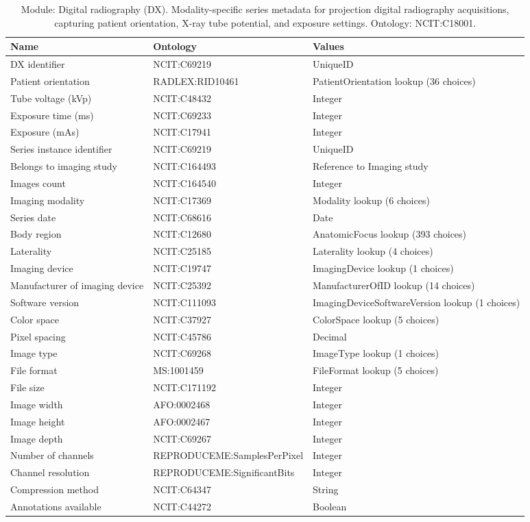 \documentclass{article}
\begin{document}
\begin{table}[htb]
\begin{tabular}{lll}
Name & Ontology & Values \\
\hline
DX identifier & NCIT:C69219 & UniqueID \\
Patient orientation & RADLEX:RID10461 & PatientOrientation lookup (36 choices) \\
Tube voltage (kVp) & NCIT:C48432 & Integer \\
Exposure time (ms) & NCIT:C69233 & Integer \\
Exposure (mAs) & NCIT:C17941 & Integer \\
Series instance identifier & NCIT:C69219 & UniqueID \\
Belongs to imaging study & NCIT:C164493 & Reference to Imaging study \\
Images count & NCIT:C164540 & Integer \\
Imaging modality & NCIT:C17369 & Modality lookup (6 choices) \\
Series date & NCIT:C68616 & Date \\
Body region & NCIT:C12680 & AnatomicFocus lookup (393 choices) \\
Laterality & NCIT:C25185 & Laterality lookup (4 choices) \\
Imaging device & NCIT:C19747 & ImagingDevice lookup (1 choices) \\
Manufacturer of imaging device & NCIT:C25392 & ManufacturerOfID lookup (14 choices) \\
Software version & NCIT:C111093 & ImagingDeviceSoftwareVersion lookup (1 choices) \\
Color space & NCIT:C37927 & ColorSpace lookup (5 choices) \\
Pixel spacing & NCIT:C45786 & Decimal \\
Image type & NCIT:C69268 & ImageType lookup (1 choices) \\
File format & MS:1001459 & FileFormat lookup (5 choices) \\
File size & NCIT:C171192 & Integer \\
Image width & AFO:0002468 & Integer \\
Image height & AFO:0002467 & Integer \\
Image depth & NCIT:C69267 & Integer \\
Number of channels & REPRODUCEME:SamplesPerPixel & Integer \\
Channel resolution & REPRODUCEME:SignificantBits & Integer \\
Compression method & NCIT:C64347 & String \\
Annotations available & NCIT:C44272 & Boolean \\
\hline
\end{tabular}
\caption[Module: Digital radiography (DX)]{\label{table:table18} Module: Digital radiography (DX). Modality-specific series metadata for projection digital radiography acquisitions, capturing patient orientation, X-ray tube potential, and exposure settings. Ontology: NCIT:C18001. }
\end{table}
\end{document}
